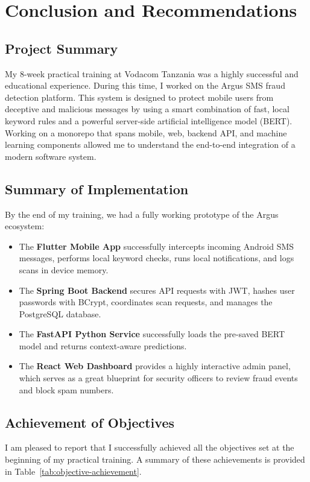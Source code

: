 \chapter{Conclusion and Recommendations}
\label{ch:conclusion}

\section{Project Summary}
My 8-week practical training at Vodacom Tanzania was a highly successful and educational experience. During this time, I worked on the Argus SMS fraud detection platform. This system is designed to protect mobile users from deceptive and malicious messages by using a smart combination of fast, local keyword rules and a powerful server-side artificial intelligence model (BERT). Working on a monorepo that spans mobile, web, backend API, and machine learning components allowed me to understand the end-to-end integration of a modern software system.

\section{Summary of Implementation}
By the end of my training, we had a fully working prototype of the Argus ecosystem:
\begin{itemize}
  \item The \textbf{Flutter Mobile App} successfully intercepts incoming Android SMS messages, performs local keyword checks, runs local notifications, and logs scans in device memory.
  \item The \textbf{Spring Boot Backend} secures API requests with JWT, hashes user passwords with BCrypt, coordinates scan requests, and manages the PostgreSQL database.
  \item The \textbf{FastAPI Python Service} successfully loads the pre-saved BERT model and returns context-aware predictions.
  \item The \textbf{React Web Dashboard} provides a highly interactive admin panel, which serves as a great blueprint for security officers to review fraud events and block spam numbers.
\end{itemize}

\section{Achievement of Objectives}
I am pleased to report that I successfully achieved all the objectives set at the beginning of my practical training. A summary of these achievements is provided in Table~\ref{tab:objective-achievement}.

